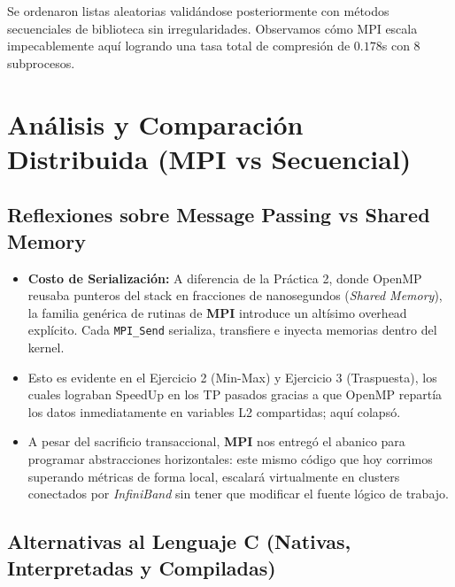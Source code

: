 \documentclass[11pt,a4paper]{article}
\begin{document}
Se ordenaron listas aleatorias validándose posteriormente con métodos secuenciales de biblioteca sin irregularidades. Observamos cómo MPI escala impecablemente aquí logrando una tasa total de compresión de $0.178$s con 8 subprocesos.

\newpage
\section{Análisis y Comparación Distribuida (MPI vs Secuencial)}

\subsection*{Reflexiones sobre Message Passing vs Shared Memory}
\begin{itemize}
    \item \textbf{Costo de Serialización:} A diferencia de la Práctica 2, donde OpenMP reusaba punteros del stack en fracciones de nanosegundos (\textit{Shared Memory}), la familia genérica de rutinas de \textbf{MPI} introduce un altísimo overhead explícito. Cada \texttt{MPI\_Send} serializa, transfiere e inyecta memorias dentro del kernel. 
    \item Esto es evidente en el Ejercicio 2 (Min-Max) y Ejercicio 3 (Traspuesta), los cuales lograban SpeedUp en los TP pasados gracias a que OpenMP repartía los datos inmediatamente en variables L2 compartidas; aquí colapsó.
    \item A pesar del sacrificio transaccional, \textbf{MPI} nos entregó el abanico para programar abstracciones horizontales: este mismo código que hoy corrimos superando métricas de forma local, escalará virtualmente en clusters conectados por \emph{InfiniBand} sin tener que modificar el fuente lógico de trabajo.  
\end{itemize}

\subsection*{Alternativas al Lenguaje C (Nativas, Interpretadas y Compiladas)}
\end{document}
